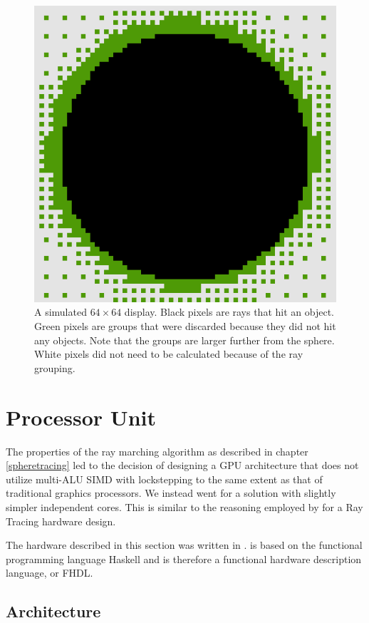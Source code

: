 			\begin{figure}[H]
                \centering
                \includegraphics[width=0.75\linewidth]{figure/raybunching} 
								\caption{A simulated $64 \times 64$ display. Black pixels are
								rays that hit an object. Green pixels are groups that were
								discarded because they did not hit any objects. Note that the
								groups are larger further from the sphere. White pixels did not
								need to be calculated because of the ray grouping. }
								\label{raybunch}
            \end{figure}

	\section{Processor Unit} \label{implproc}

		The properties of the ray marching algorithm as described in chapter
		\ref{spheretracing} led to the decision of designing a GPU architecture
		that does not utilize multi-ALU SIMD with lockstepping to the same
		extent as that of traditional graphics processors. We instead went for
		a solution with slightly simpler independent cores. This is similar to
		the reasoning employed by \cite{Woop2005} for a Ray Tracing hardware
		design.

		The hardware described in this section was written in \clash. \clash is
		based on the functional programming language Haskell and is therefore a
		functional hardware description language, or FHDL.

		\subsection{Architecture}

